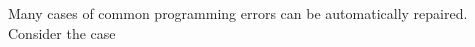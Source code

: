 \documentclass[sigplan,10pt]{acmart}
\begin{document}
Many cases of common programming errors can be automatically repaired.
%
%
%
Consider the case
\end{document}
